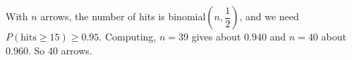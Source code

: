 With $n$ arrows, the number of hits is binomial$(n,\dfrac12)$, and we need $P(\text{hits}\ge15)\ge0.95$. Computing, $n=39$ gives about $0.940$ and $n=40$ about $0.960$. So $\boxed{40}$ arrows.
